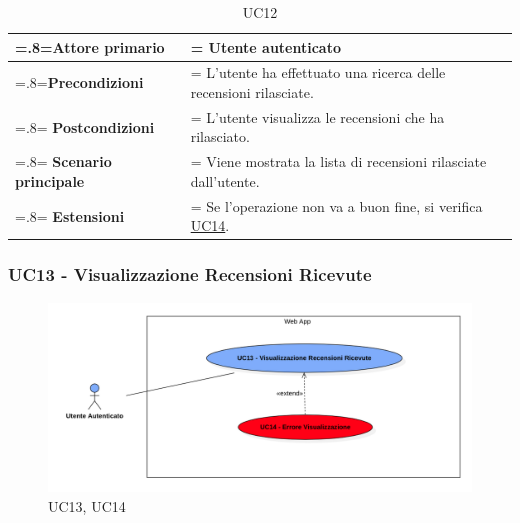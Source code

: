             \begin{table}[H]
                \centering
                \renewcommand{\arraystretch}{1.8}
                \renewcommand\tabularxcolumn[1]{m{#1}}
                \begin{tabularx}{0.9\textwidth} {
                    >{\hsize=.8\hsize\linewidth=\hsize}X
                    >{\hsize=1.2\hsize\linewidth=\hsize}X}
                    \hline
                    \textbf{Attore primario} & Utente autenticato \\
                    \hline
                    \textbf{Precondizioni} & L'utente ha effettuato una ricerca delle recensioni rilasciate. \\
                    \hline
                    \textbf{Postcondizioni} & L'utente visualizza le recensioni che ha rilasciato. \\
                    \hline
                    \textbf{Scenario principale} & Viene mostrata la lista di recensioni rilasciate dall'utente. \\
                    \hline
                    \textbf{Estensioni} & Se l'operazione non va a buon fine, si verifica \hyperref[UC14]{UC14}. \\
                    \hline
                \end{tabularx}
                \caption{UC12}
            \end{table}

        \subsubsection{UC13 - Visualizzazione Recensioni Ricevute}
        \label{UC13}

            \begin{figure}[H]
                \centering
                \includegraphics[scale=0.4]{src/img/UC13.png}
                \caption{UC13, UC14}
            \end{figure}

